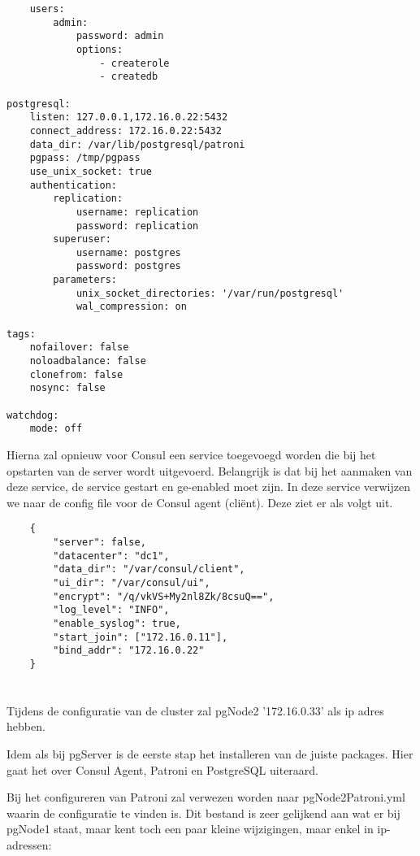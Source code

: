 \begin{lstlisting}
    users:
        admin:
            password: admin
            options:
                - createrole
                - createdb

postgresql:
    listen: 127.0.0.1,172.16.0.22:5432
    connect_address: 172.16.0.22:5432
    data_dir: /var/lib/postgresql/patroni
    pgpass: /tmp/pgpass
    use_unix_socket: true
    authentication:
        replication:
            username: replication
            password: replication
        superuser:
            username: postgres
            password: postgres
        parameters:
            unix_socket_directories: '/var/run/postgresql'
            wal_compression: on

tags:
    nofailover: false
    noloadbalance: false
    clonefrom: false
    nosync: false

watchdog:
    mode: off
\end{lstlisting}

Hierna zal opnieuw voor Consul een service toegevoegd worden die bij het opstarten van de server wordt uitgevoerd. Belangrijk is dat bij het aanmaken van deze service, de service gestart en ge-enabled moet zijn. In deze service verwijzen we naar de config file voor de Consul agent (cliënt). Deze ziet er als volgt uit.

\begin{lstlisting}
    {
        "server": false,
        "datacenter": "dc1",
        "data_dir": "/var/consul/client",
        "ui_dir": "/var/consul/ui",
        "encrypt": "/q/vkVS+My2nl8Zk/8csuQ==", 
        "log_level": "INFO",
        "enable_syslog": true,
        "start_join": ["172.16.0.11"],
        "bind_addr": "172.16.0.22"
    }  
\end{lstlisting}


\section{}
\label{sec:pgNode2}
Tijdens de configuratie van de cluster zal pgNode2 '172.16.0.33' als ip adres hebben.

Idem als bij pgServer is de eerste stap het installeren van de juiste packages. Hier gaat het over Consul Agent, Patroni en PostgreSQL uiteraard.

Bij het configureren van Patroni zal verwezen worden naar pgNode2Patroni.yml waarin de configuratie te vinden is. Dit bestand is zeer gelijkend aan wat er bij pgNode1 staat, maar kent toch een paar kleine wijzigingen, maar enkel in ip-adressen:

